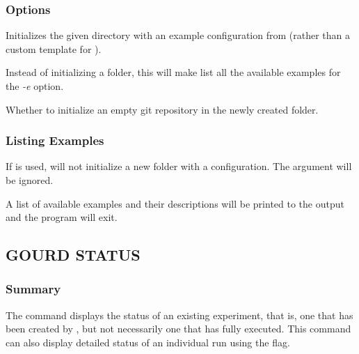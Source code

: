 \documentclass[a4paper,english]{article}
\begin{document}
\begin{adjustwidth}{18pt}{0pt}
            \subsubsection{Options}
                \begin{Description}[Options]
                    \item[\OptArg{-e, \ddash example}{ example-name}]
                      Initializes the given directory with an example configuration from 
                      (rather than a custom template for ).
                    \item[\Opt{\ddash list-examples}]
                      Instead of initializing a folder, this will make  list all the available
                      examples for the \emph{-e} option.
                    \item[\OptArg{\ddash git}{=true|false}]
                      Whether to initialize an empty git repository in the newly created folder.
                \end{Description}

            \subsubsection{Listing Examples}
                If  is used,   will not initialize a new folder with
                a configuration.
                The  argument will be ignored.

                A list of available examples and their descriptions will be printed to the output and
                the program will exit.

        \subsection{GOURD STATUS}

            \subsubsection{Summary}
                The   command displays the status of an existing experiment,
                that is, one that has been created by  , but not necessarily
                one that has fully executed.
                This command can also display detailed status of an individual run using the  flag.


\end{adjustwidth}
\end{document}
